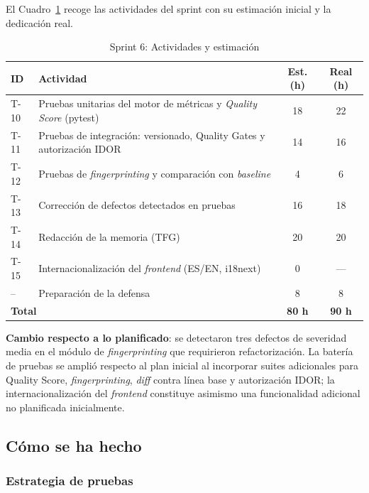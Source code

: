 El Cuadro~\ref{tab:sprint6-hu} recoge las actividades del sprint con su
estimación inicial y la dedicación real.

\begin{table}[H]
  \centering
  \small
  \caption{Sprint 6: Actividades y estimación}
  \label{tab:sprint6-hu}
  \begin{tabularx}{\textwidth}{l X c c}
    \toprule
    \textbf{ID} & \textbf{Actividad} & \textbf{Est. (h)} & \textbf{Real (h)} \\
    \midrule
    T-10  & Pruebas unitarias del motor de métricas y \emph{Quality Score} (pytest) & 18 & 22 \\
    T-11  & Pruebas de integración: versionado, Quality Gates y autorización IDOR & 14 & 16 \\
    T-12  & Pruebas de \emph{fingerprinting} y comparación con \emph{baseline} & 4 & 6 \\
    T-13  & Corrección de defectos detectados en pruebas & 16 & 18 \\
    T-14  & Redacción de la memoria (\ac{TFG}) & 20 & 20 \\
    T-15  & Internacionalización del \emph{frontend} (ES/EN, i18next) & 0 & --- \\
    --    & Preparación de la defensa & 8 & 8 \\
    \midrule
    \multicolumn{2}{l}{\textbf{Total}} & \textbf{80 h} & \textbf{90 h} \\
    \bottomrule
  \end{tabularx}
\end{table}

\textbf{Cambio respecto a lo planificado}: se detectaron tres
defectos de severidad media en el módulo de \emph{fingerprinting} que
requirieron refactorización.  La batería de pruebas se amplió respecto
al plan inicial al incorporar suites adicionales para Quality Score,
\emph{fingerprinting}, \emph{diff} contra línea base y autorización
\ac{IDOR}; la internacionalización del \emph{frontend} constituye
asimismo una funcionalidad adicional no planificada inicialmente.

\subsection{Cómo se ha hecho}

\subsubsection{Estrategia de pruebas}
\label{sec:impl-pruebas}

